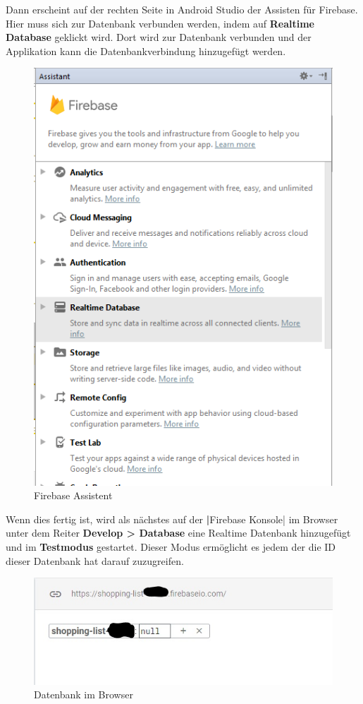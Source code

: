 \clearpage

Dann erscheint auf der rechten Seite in Android Studio der Assisten für Firebase. Hier muss sich zur Datenbank verbunden werden, indem auf \textbf{Realtime Database} geklickt wird. Dort wird zur Datenbank verbunden und der Applikation kann die Datenbankverbindung hinzugefügt werden.

\begin{figure}[!h]
	\begin{center}
		\includegraphics[width=0.5\linewidth]{images/firebase-ass.png}
		\caption{Firebase Assistent}
	\end{center}
\end{figure}

Wenn dies fertig ist, wird als nächstes auf der \textbf|Firebase Konsole| im Browser unter dem Reiter \textbf{Develop > Database} eine Realtime Datenbank hinzugefügt und im \textbf{Testmodus} gestartet. Dieser Modus ermöglicht es jedem der die ID dieser Datenbank hat darauf zuzugreifen.

\begin{figure}[!h]
	\begin{center}
		\includegraphics[width=0.6\linewidth]{images/database.jpg}
		\caption{Datenbank im Browser}
	\end{center}
\end{figure}

